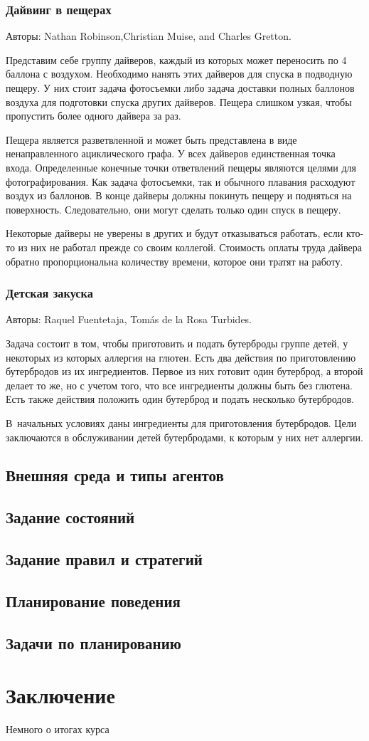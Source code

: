 \documentclass[b5paper,11pt]{book}
\begin{document}
	\subsection{Дайвинг в пещерах}
	Авторы: Nathan Robinson,Christian Muise, and Charles Gretton.
	
	Представим себе группу дайверов, каждый из которых может переносить по 4 баллона с воздухом. Необходимо нанять этих дайверов для спуска в подводную пещеру. У них стоит задача фотосъемки либо задача доставки полных баллонов воздуха для подготовки спуска других дайверов. Пещера слишком узкая, чтобы пропустить более одного дайвера за раз.
	
	Пещера является разветвленной и может быть представлена в виде ненаправленного ациклического графа. У всех дайверов единственная точка входа. Определенные конечные точки ответвлений пещеры являются целями для фотографирования. Как задача фотосъемки, так и обычного плавания расходуют воздух из баллонов. В конце дайверы должны покинуть пещеру и подняться на поверхность. Следовательно, они могут сделать только один спуск в пещеру.
	
	Некоторые дайверы не уверены в других и будут отказываться работать, если кто-то из них не работал прежде со своим коллегой. Стоимость оплаты труда дайвера обратно пропорциональна количеству времени, которое они тратят на работу. 
	\subsection{Детская закуска}
	Авторы: Raquel Fuentetaja, Tomás de la Rosa Turbides. 
	
	Задача состоит в том, чтобы приготовить и подать бутерброды группе детей, у некоторых из которых аллергия на глютен. Есть два действия по приготовлению бутербродов из их ингредиентов. Первое из них готовит один бутерброд, а второй делает то же, но с учетом того, что все ингредиенты должны быть без глютена. Есть также действия положить один бутерброд и подать несколько бутербродов. 
	
	В~начальных условиях даны ингредиенты для приготовления бутербродов. Цели заключаются в обслуживании детей бутербродами, к которым у них нет аллергии.
	\section{Внешняя среда и типы агентов}
	\section{Задание состояний}
	\section{Задание правил и стратегий}
	\section{Планирование поведения}
	\section{Задачи по планированию}
	
	

	\chapter*{Заключение}
	Немного о итогах курса
	\printbibliography
\end{document}
